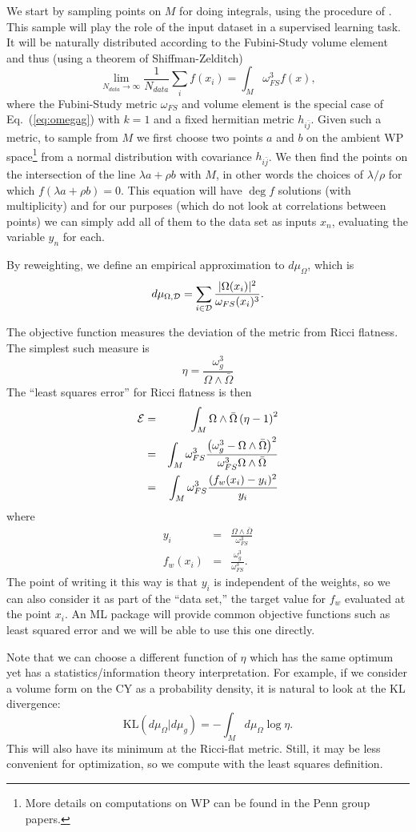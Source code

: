 \documentclass[12pt]{article}
\def\CD {{\cal D}}
\def\CE {{\cal E}}
\newcommand{\eq}[1]{Eq.~(\ref{eq:#1})}
\newcommand{\be}{\begin{equation}}
\newcommand{\ee}{\end{equation}}
\newcommand{\bea}{\begin{eqnarray}}
\newcommand{\eea}{\end{eqnarray}}
\def\bj{{\bar{j}}}
\begin{document}
We start by sampling points on $M$ for doing integrals, using the procedure of \cite{Douglas}.
This sample will play the role of the input dataset in a supervised learning task.
It will be naturally distributed according to the Fubini-Study volume element and thus (using a theorem
of Shiffman-Zelditch)
\be
\lim_{N_{data}\rightarrow\infty} \frac{1}{N_{data}} \sum_i f(x_i) = \int_M \omega_{FS}^3 f(x) ,
\ee
where the Fubini-Study metric $\omega_{FS}$ and volume element is the special case of \eq{omegag} with $k=1$
and a fixed hermitian metric $h_{i\bj}$.  Given such a metric, to sample from $M$ we first choose two points
$a$ and $b$ on the ambient WP space\footnote{ 
More details on computations on WP can be found
in the Penn group papers.} 
from a normal distribution with covariance $h_{i\bj}$.
We then find the points on the intersection of the line $\lambda a+\rho b$ with $M$, in other words
the choices of $\lambda/\rho$ for which $f(\lambda a+\rho b)=0$.  This equation will have $\deg f$
solutions (with multiplicity) and for our purposes (which do not look at correlations between points) we
can simply add all of them to the data set as inputs $x_n$, evaluating the variable $y_n$ for each.

By reweighting, we define an empirical approximation to $d\mu_\Omega$, which is
\be\label{eq:muOmegaD}
d\mu_{\Omega,\CD} = \sum_{i\in \CD} \frac{ |\Omega(x_i)|^2 }{ \omega_{FS}(x_i)^3 } .
\ee

The objective function measures the deviation of the metric from Ricci flatness.  The simplest such measure
is
\be
\eta = \frac{ \omega_g^3 }{ \Omega\wedge\bar\Omega }
\ee
The ``least squares error'' for Ricci flatness is then
\bea
\CE &=& \int_M \Omega\wedge\bar\Omega \left(\eta-1\right)^2 \\
&=& \int_M \omega_{FS}^3 \frac{\left( \omega_g^3-\Omega\wedge\bar\Omega \right)^2 }{ 
\omega_{FS}^3 \Omega\wedge\bar\Omega } \\
&=& \int_M \omega_{FS}^3 \frac{(f_w(x_i) - y_i)^2}{y_i}
\label{eq:cyobj}
\eea
where
\bea
y_i &=& \frac{ \Omega\wedge\bar\Omega }{ \omega_{FS}^3 } \\
f_w(x_i) &=& \frac{ \omega_g^3 }{ \omega_{FS}^3 } .
\eea
The point of writing it this way is that $y_i$ is independent of the weights, so we can also consider
it as part of the ``data set,'' the target value for $f_w$ evaluated at the point $x_i$.  An ML package
will provide common objective functions such as least squared error and we will be able to use this one directly.

Note that we can choose a different function of $\eta$ which has the same optimum yet has
a statistics/information theory interpretation.  For example, if we consider a volume form on the CY as
a probability density, it is natural to look at the KL divergence:
\be \label{eq:KLobj}
\mbox{KL}\left( d\mu_\Omega | d\mu_g \right) = 
-\int_M d\mu_\Omega \log \eta .
\ee
This will also have its minimum at the Ricci-flat metric.
Still, it may be less convenient for optimization, so we compute with the least squares definition.
\end{document}
